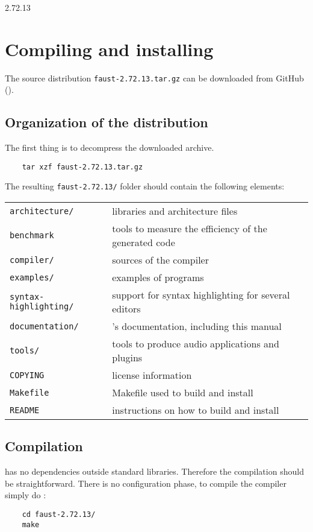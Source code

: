 2.72.13\chapter{Compiling and installing \faust}
\label{install}


The \faust source distribution \lstinline'faust-2.72.13.tar.gz' can be downloaded from GitHub ().

\section{Organization of the distribution}
The first thing is to decompress the downloaded archive. 
\begin{lstlisting}
	tar xzf faust-2.72.13.tar.gz
\end{lstlisting}

The resulting \lstinline'faust-2.72.13/' folder should contain the following elements:

\begin{tabular}{ll}
	\lstinline'architecture/' 		&\faust libraries and architecture files\\
	\lstinline'benchmark'			&tools to measure the efficiency of the generated code\\
	\lstinline'compiler/'			&sources of the \faust compiler\\
	\lstinline'examples/'			&examples of \faust programs\\
	\lstinline'syntax-highlighting/'&	support for syntax highlighting for several editors\\
	\lstinline'documentation/' 		&\faust's documentation, including this manual\\
	\lstinline'tools/'				&tools to produce audio applications and plugins\\
	\lstinline'COPYING'			&license information\\
	\lstinline'Makefile'			&Makefile used to build and install \faust\\
	\lstinline'README'			&instructions on how to build and install \faust
\end{tabular}

\section{Compilation}
\faust has no dependencies outside standard libraries. Therefore the compilation should be straightforward. There is no configuration phase, to compile the \faust compiler simply do :
\begin{lstlisting}
	cd faust-2.72.13/
	make
\end{lstlisting}

